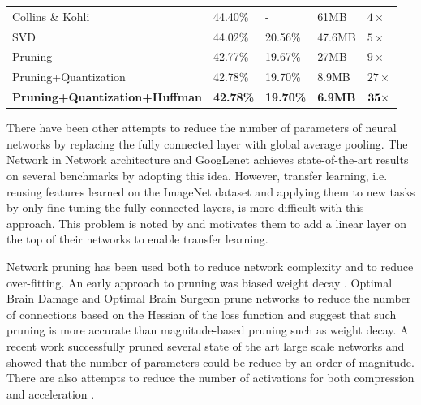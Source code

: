 \documentclass{article} %
\begin{document}
\begin{table}[t]
\begin{tabular}{lllll}
\multicolumn{1}{l|}{Collins \& Kohli \citep{collins2014memory}}& 44.40\%     & \multicolumn{1}{l|}{-}         & \multicolumn{1}{l|}{61MB}      & $4\times$ \\
\multicolumn{1}{l|}{SVD \citep{denton2014LinearStructure}}                           & 44.02\%       & \multicolumn{1}{l|}{20.56\%}   & \multicolumn{1}{l|}{47.6MB}      & $5\times$ \\
\multicolumn{1}{l|}{Pruning \citep{song_pruning}}       & 42.77\%   & \multicolumn{1}{l|}{19.67\%}     & \multicolumn{1}{l|}{27MB}         & $9\times$     \\
\multicolumn{1}{l|}{Pruning+Quantization}     & 42.78\%   & \multicolumn{1}{l|}{19.70\%}     & \multicolumn{1}{l|}{8.9MB}         & $27\times$     \\
\multicolumn{1}{l|}{\bf{Pruning+Quantization+Huffman}}  & \bf{42.78}\%   & \multicolumn{1}{l|}{\bf{19.70\%}}     & \multicolumn{1}{l|}{\bf{6.9MB}}         & $\bf{35\times}$     \\ \hline
\end{tabular}

\label{table:compare}
\end{table}



There have been other attempts to reduce the number of parameters of neural networks by replacing the fully connected layer with global average pooling. The Network in Network architecture\citep{NiN} and GoogLenet\citep{szegedy2014GoogLenet} achieves state-of-the-art results on several benchmarks by adopting this idea. However, transfer learning, i.e. reusing features learned on the ImageNet dataset and applying them to new tasks by only fine-tuning the fully connected layers, is more difficult with this approach. This problem is noted by \citet{szegedy2014GoogLenet} and motivates them to add a linear layer on the top of their networks to enable transfer learning. 

Network pruning has been used both to reduce network complexity
and to reduce over-fitting.
An early approach to pruning was biased weight decay \citep{hanson1989comparing}.
Optimal Brain Damage \citep{lecun1989optimal} and Optimal Brain Surgeon \citep{hassibi1993second} prune networks to reduce the number of connections based on the Hessian of the loss function and suggest that such pruning is more accurate than magnitude-based pruning such as weight decay. A recent work \citep{song_pruning} successfully pruned several state of the art large scale networks and showed that the number of parameters could be reduce by an order of magnitude. There are also attempts to reduce the number of activations for both compression and acceleration \citet{van2015cross}.
\end{document}
